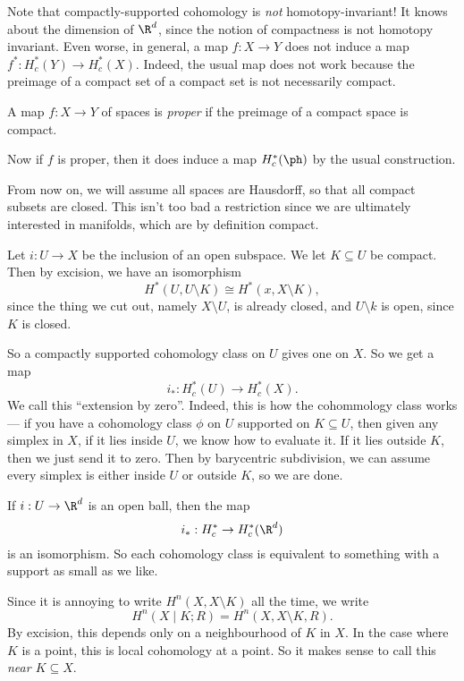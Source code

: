 \documentclass[a4paper]{article}
\begin{document}
Note that compactly-supported cohomology is \emph{not} homotopy-invariant! It knows about the dimension of $\R^d$, since the notion of compactness is not homotopy invariant. Even worse, in general, a map $f: X \to Y$ does not induce a map $f^*: H^*_c(Y) \to H^*_c(X)$. Indeed, the usual map does not work because the preimage of a compact set of a compact set is not necessarily compact.
\begin{defi}
  A map $f: X \to Y$ of spaces is \emph{proper} if the preimage of a compact space is compact.
\end{defi}
Now if $f$ is proper, then it does induce a map $H_c^* (\ph)$ by the usual construction.

From now on, we will assume all spaces are Hausdorff, so that all compact subsets are closed. This isn't too bad a restriction since we are ultimately interested in manifolds, which are by definition compact.

Let $i: U \to X$ be the inclusion of an open subspace. We let $K \subseteq U$ be compact. Then by excision, we have an isomorphism
\[
  H^*(U, U \setminus K) \cong H^*(x, X \setminus K),
\]
since the thing we cut out, namely $X \setminus U$, is already closed, and $U \setminus k$ is open, since $K$ is closed.

So a compactly supported cohomology class on $U$ gives one on $X$. So we get a map
\[
  i_*: H_c^*(U) \to H_c^*(X).
\]
We call this ``extension by zero''. Indeed, this is how the cohommology class works --- if you have a cohomology class $\phi$ on $U$ supported on $K \subseteq U$, then given any simplex in $X$, if it lies inside $U$, we know how to evaluate it. If it lies outside $K$, then we just send it to zero. Then by barycentric subdivision, we can assume every simplex is either inside $U$ or outside $K$, so we are done.

\begin{eg}
  If $i: U \to \R^d$ is an open ball, then the map
  \[
    i_*: H_c^* \to H_c^*(\R^d)
  \]
  is an isomorphism. So each cohomology class is equivalent to something with a support as small as we like.
\end{eg}

Since it is annoying to write $H^n(X, X \setminus K)$ all the time, we write
\[
  H^n(X\mid K; R) = H^n(X, X \setminus K, R).
\]
By excision, this depends only on a neighbourhood of $K$ in $X$. In the case where $K$ is a point, this is local cohomology at a point. So it makes sense to call this  \emph{near $K \subseteq X$}.
\end{document}
